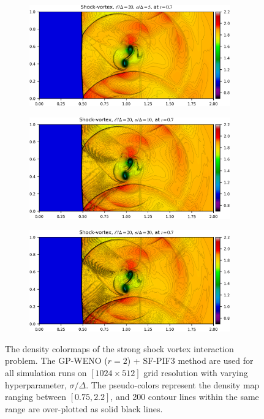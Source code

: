 \begin{figure}
    \centering
    \begin{subfigure}{120mm}
        \centering
        \includegraphics[width=0.95\textwidth]{fig/shockvortex_gp_ed20_sd5.png}
    \end{subfigure}
    \begin{subfigure}{120mm}
        \centering
        \includegraphics[width=0.95\textwidth]{fig/shockvortex_gp_ed20_sd10.png}
    \end{subfigure}
    \begin{subfigure}{120mm}
        \centering
        \includegraphics[width=0.95\textwidth]{fig/shockvortex_gp_ed20_sd20.png}
    \end{subfigure}
    \caption{The density colormaps of the strong shock vortex interaction problem.
        The GP-WENO (\( r = 2 \)) + SF-PIF3 method
        are used for all simulation runs
        on \( [1024 \times 512] \) grid resolution
        with varying hyperparameter, \( \sigma/\Delta \).
        The pseudo-colors represent the density map ranging between \( [0.75, 2.2] \),
        and 200 contour lines within the same range are over-plotted as solid black lines.
    }\label{fig:shockvortex}
\end{figure}


